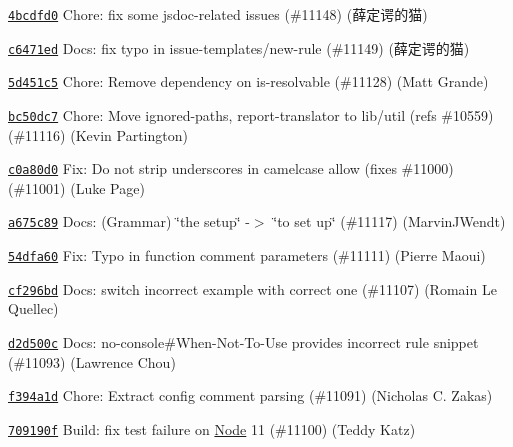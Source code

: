 \begin{DoxyItemize}
\item \href{https://github.com/eslint/eslint/commit/4bcdfd07d514fd7a6b8672d33703d0b6c606f214}{\texttt{ {\ttfamily 4bcdfd0}}} Chore\+: fix some jsdoc-\/related issues (\#11148) (薛定谔的猫)
\item \href{https://github.com/eslint/eslint/commit/c6471ed6feb3e71e239379a7042deb9b8ab3cf39}{\texttt{ {\ttfamily c6471ed}}} Docs\+: fix typo in issue-\/templates/new-\/rule (\#11149) (薛定谔的猫)
\item \href{https://github.com/eslint/eslint/commit/5d451c510c15abc41b5bb14b4955a7db96aeb100}{\texttt{ {\ttfamily 5d451c5}}} Chore\+: Remove dependency on is-\/resolvable (\#11128) (Matt Grande)
\item \href{https://github.com/eslint/eslint/commit/bc50dc7737496712463220e662946eb516e36ae1}{\texttt{ {\ttfamily bc50dc7}}} Chore\+: Move ignored-\/paths, report-\/translator to lib/util (refs \#10559) (\#11116) (Kevin Partington)
\item \href{https://github.com/eslint/eslint/commit/c0a80d0ca3c80ca27694fc8aedcf84b72bfd9465}{\texttt{ {\ttfamily c0a80d0}}} Fix\+: Do not strip underscores in camelcase allow (fixes \#11000) (\#11001) (Luke Page)
\item \href{https://github.com/eslint/eslint/commit/a675c89573836adaf108a932696b061946abf1e6}{\texttt{ {\ttfamily a675c89}}} Docs\+: (Grammar) \char`\"{}the setup\char`\"{} -\/$>$ \char`\"{}to set up\char`\"{} (\#11117) (Marvin\+J\+Wendt)
\item \href{https://github.com/eslint/eslint/commit/54dfa602f62e6d183d57d60d5fdd417a263f479e}{\texttt{ {\ttfamily 54dfa60}}} Fix\+: Typo in function comment parameters (\#11111) (Pierre Maoui)
\item \href{https://github.com/eslint/eslint/commit/cf296bdabf0dbbfbae491419e38aee4ecd63ec71}{\texttt{ {\ttfamily cf296bd}}} Docs\+: switch incorrect example with correct one (\#11107) (Romain Le Quellec)
\item \href{https://github.com/eslint/eslint/commit/d2d500ca5dff307189b9d4161a5e7b8282557dd6}{\texttt{ {\ttfamily d2d500c}}} Docs\+: no-\/console\#\+When-\/Not-\/\+To-\/\+Use provides incorrect rule snippet (\#11093) (Lawrence Chou)
\item \href{https://github.com/eslint/eslint/commit/f394a1dfc5eb4874f899b7bc19685896893af7b8}{\texttt{ {\ttfamily f394a1d}}} Chore\+: Extract config comment parsing (\#11091) (Nicholas C. Zakas)
\item \href{https://github.com/eslint/eslint/commit/709190f8c5d7559b1e0915e25af60b50a94ba1c7}{\texttt{ {\ttfamily 709190f}}} Build\+: fix test failure on \mbox{\hyperlink{class_node}{Node}} 11 (\#11100) (Teddy Katz)

\end{DoxyItemize}
